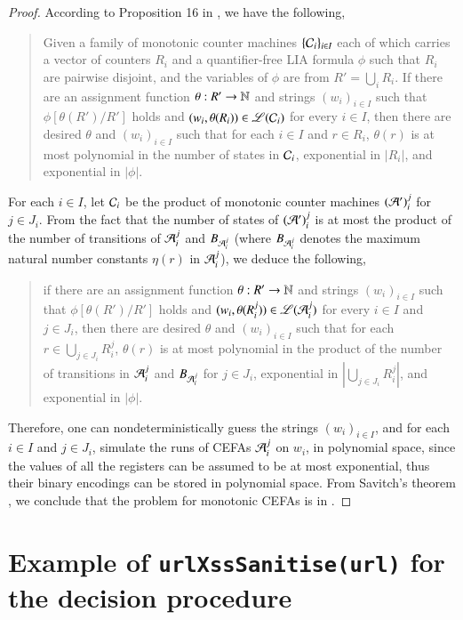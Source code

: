\begin{proof}
	According to Proposition 16 in \cite{LB16}, we have the following, 
	\begin{quote}
		Given a family of monotonic counter machines $\{ \mathcal{C}_i \}_{i\in I}$ each of which carries a vector of counters $R_i$ and a quantifier-free LIA formula $\phi$ such that $ R_i$ are pairwise disjoint,  and the variables of $\phi$ are from $R'=\bigcup_{i} R_i$. If there are an assignment function $\theta: R' \rightarrow \mathbb{N}$ and strings $(w_i)_{i \in I}$ such that  $\phi[\theta(R' )/R']$ holds and $(w_i, \theta(R_i)) \in \mathscr{L}(\mathcal{C}_{i})$ for every $i \in I$, then there are desired $\theta$ and $(w_i)_{i \in I}$ such that for each $i \in I$ and $r \in R_i$, $\theta(r)$ is at most polynomial in the number of states in $\mathcal{C}_i $, exponential in $|R_i|$, and exponential in $|\phi|$.
	\end{quote}
	For each $i \in I$, let $\mathcal{C}_i$ be the product of monotonic counter machines $(\mathcal{A}')_i^j$ for $j \in J_i$. 
	From the fact that the number of states of $(\mathcal{A}')_i^j$ is at most the product of the number of transitions of $\mathcal{A}_i^j$ and $B_{\mathcal{A}_i^j}$ (where $B_{\mathcal{A}_i^j}$ denotes the maximum natural number constants $\eta(r)$ in $\mathcal{A}_i^j$), we deduce the following,
	\begin{quote}
		if there are an assignment function $\theta: R' \rightarrow \mathbb{N}$ and strings $(w_i)_{i \in I}$ such that  $\phi[\theta(R' )/R']$ holds and $(w_i, \theta(R_i^j)) \in \mathscr{L}(\mathcal{A}_i^j)$ for every $i \in I$ and $j \in J_i$, then there are desired $\theta$ and $(w_i)_{i \in I}$ such that for each $r \in \bigcup_{j \in J_i} R^j_i$, $\theta(r)$ is at most polynomial in the product of the number of transitions in $\mathcal{A}_i^j$ and $B_{\mathcal{A}_i^j}$ for $j \in J_i$, exponential in $\left|\bigcup_{j \in J_i} R^j_i \right|$, and exponential in $|\phi|$.
	\end{quote}
	
	Therefore, one can nondeterministically guess the strings $(w_i)_{i \in I}$, and for each $i \in I$ and $j \in J_i$, simulate the runs of CEFAs $\mathcal{A}_i^j$ on $w_i$, in polynomial space, since  the values of all the registers can be assumed to be at most exponential, thus their binary encodings can be stored in polynomial space. From Savitch's theorem \cite{complexity-book}, we conclude that the {\lasat} problem for monotonic CEFAs is in {\pspace}.
\end{proof}


\section{Example of {\tt urlXssSanitise(url)} for the decision procedure} \label{app:urlexample}

